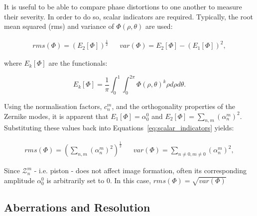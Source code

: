 It is useful to be able to compare phase distortions to one another to
measure their severity. In order to do so, scalar indicators are required.
Typically, the root mean squared (rms) and variance of $\Phi\left(\rho,\theta\right)$
are used:

\begin{align}\label{eq:scalar_indicators}
rms(\Phi) = \left(E_{2}\left[\Phi\right]\right)^{\frac{1}{2}} && 
var(\Phi) = E_{2}\left[\Phi\right] - \left(E_{1}\left[\Phi\right]\right)^{2},
\end{align}

where $E_{k}\left[\Phi\right]$ are the 
functionals\cite{antonello2014optimisation,mahajan1994zernike}:

\begin{equation}\label{eq:E_functionals}
	E_{k}\left[\Phi\right] = \frac{1}{\pi} \int_{0}^{1}\int_{0}^{2\pi} \Phi\left(\rho,\theta\right)^{k}\rho d\rho d\theta.
\end{equation}

Using the normalisation factors, $c_{n}^{m}$, and the orthogonality
properties of the Zernike modes, it is apparent that $E_{1}\left[\Phi\right] 
= \alpha_{0}^{0}$ and $E_{2}\left[\Phi\right] = 
\sum\limits_{n,m}{\left({\alpha_{n}^{m}}\right)^{2}}$. Substituting 
these values back into Equations~\ref{eq:scalar_indicators} yields:

\begin{align}\label{eq:scalar_indicators_new}
rms(\Phi) = \left(\sum\limits_{n,m}{\left({\alpha_{n}^{m}}\right)^{2}}\right)^{\frac{1}{2}} && 
var(\Phi) = \sum\limits_{n\ne 0,m\ne 0}{\left({\alpha_{n}^{m}}\right)^{2}},
\end{align}

Since $\mathcal{Z}_{n}^{m}$ - i.e. piston - does not affect image 
formation, often its corresponding amplitude $\alpha_{0}^{0}$ is
arbitrarily set to $0$. In this case, $rms(\Phi) = \sqrt{var(\Phi)}$

\subsection{Aberrations and Resolution}
\label{subsec:aberrations_and_resolution}

